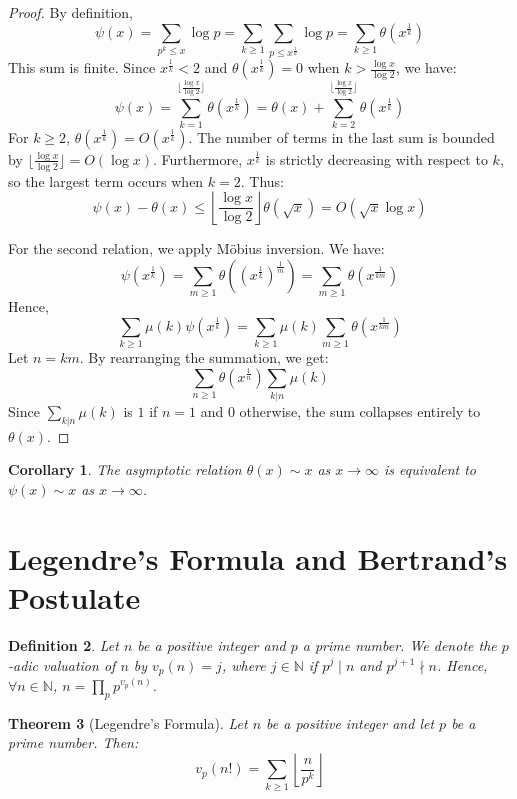 \documentclass[a4paper]{article}
\newtheorem{theorem}{Theorem}
\newtheorem{corollary}[theorem]{Corollary}
\newtheorem{definition}[theorem]{Definition}
\begin{document}
\begin{proof}
  By definition,
  \[ \psi(x) = \sum_{p^k \le x} \log p = \sum_{k \ge 1} \sum_{p \le
  x^{\frac{1}{k}}} \log p = \sum_{k \ge 1} \theta(x^{\frac{1}{k}}) \]
  This sum is finite. Since $x^{\frac{1}{k}} < 2$ and
  $\theta(x^{\frac{1}{k}}) = 0$ when $k > \frac{\log x}{\log 2}$, we have:
  \[ \psi(x) = \sum_{k=1}^{\lfloor \frac{\log x}{\log 2} \rfloor}
    \theta(x^{\frac{1}{k}}) = \theta(x) + \sum_{k=2}^{\lfloor
  \frac{\log x}{\log 2} \rfloor} \theta(x^{\frac{1}{k}}) \]
  For $k \ge 2$, $\theta(x^{\frac{1}{k}}) = O(x^{\frac{1}{k}})$. The
  number of terms in the last sum is bounded by $\lfloor \frac{\log
  x}{\log 2} \rfloor = O(\log x)$. Furthermore, $x^{\frac{1}{k}}$ is
  strictly decreasing with respect to $k$, so the largest term occurs
  when $k=2$. Thus:
  \[ \psi(x) - \theta(x) \le \left\lfloor \frac{\log x}{\log 2}
  \right\rfloor \theta(\sqrt{x}) = O(\sqrt{x} \log x) \]

  For the second relation, we apply Möbius inversion. We have:
  \[ \psi(x^{\frac{1}{k}}) = \sum_{m \ge 1}
    \theta\left((x^{\frac{1}{k}})^{\frac{1}{m}}\right) = \sum_{m \ge 1}
  \theta(x^{\frac{1}{km}}) \]
  Hence,
  \[ \sum_{k \ge 1} \mu(k) \psi(x^{\frac{1}{k}}) = \sum_{k \ge 1}
  \mu(k) \sum_{m \ge 1} \theta(x^{\frac{1}{km}}) \]
  Let $n = km$. By rearranging the summation, we get:
  \[ \sum_{n \ge 1} \theta(x^{\frac{1}{n}}) \sum_{k | n} \mu(k) \]
  Since $\sum_{k | n} \mu(k)$ is $1$ if $n=1$ and $0$ otherwise, the
  sum collapses entirely to $\theta(x)$.
\end{proof}

\begin{corollary}
  The asymptotic relation $\theta(x) \sim x$ as $x \to \infty$ is
  equivalent to $\psi(x) \sim x$ as $x \to \infty$.
\end{corollary}

\section{Legendre's Formula and Bertrand's Postulate}

\begin{definition}
  Let $n$ be a positive integer and $p$ a prime number. We denote the
  $p$-adic valuation of $n$ by $v_p(n) = j$, where $j \in \mathbb{N}$
  if $p^j \mid n$ and $p^{j+1} \nmid n$. Hence, $\forall n \in
  \mathbb{N}$, $n = \prod_{p} p^{v_p(n)}$.
\end{definition}

\begin{theorem}[Legendre's Formula]
  Let $n$ be a positive integer and let $p$ be a prime number. Then:
  \[ v_p(n!) = \sum_{k \ge 1} \left\lfloor \frac{n}{p^k} \right\rfloor \]
\end{theorem}
\end{document}
